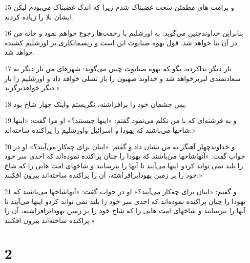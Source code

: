 \par 15 و برامت های مطمئن سخت غضبناک شدم زیرا که اندک غضبناک می‌بودم لیکن ایشان بلا را زیاده کردند.
\par 16 بنابراین خداوندچنین می‌گوید: به اورشلیم با رحمت‌ها رجوع خواهم نمود و خانه من در آن بنا خواهد شد. قول یهوه صبایوت این است و ریسمانکاری بر اورشلیم کشیده خواهد شد.
\par 17 بار دیگر نداکرده، بگو که یهوه صبایوت چنین می‌گوید: شهرهای من بار دیگر به سعادتمندی لبریزخواهد شد و خداوند صهیون را باز تسلی خواهد داد و اورشلیم را بار دیگر خواهدبرگزید.»
\par 18 پس چشمان خود را برافراشته، نگریستم واینک چهار شاخ بود.
\par 19 و به فرشته‌ای که با من تکلم می‌نمود گفتم: «اینها چیستند؟» او مرا گفت: «اینها شاخها می‌باشند که یهودا و اسرائیل واورشلیم را پراکنده ساخته‌اند.»
\par 20 و خداوندچهار آهنگر به من نشان داد.و گفتم: «اینان برای چه‌کار می‌آیند؟» او در جواب گفت: «آنهاشاخها می‌باشند که یهودا را چنان پراکنده نموده‌اند که احدی سر خود را بلند نمی تواند کردو اینها می‌آیند تا آنها را بترسانند و شاخهای امت هایی را که شاخ خود را بر زمین یهودابرافراشته، آن را پراکنده ساخته‌اند بیرون افکنند.»
\par 21 و گفتم: «اینان برای چه‌کار می‌آیند؟» او در جواب گفت: «آنهاشاخها می‌باشند که یهودا را چنان پراکنده نموده‌اند که احدی سر خود را بلند نمی تواند کردو اینها می‌آیند تا آنها را بترسانند و شاخهای امت هایی را که شاخ خود را بر زمین یهودابرافراشته، آن را پراکنده ساخته‌اند بیرون افکنند.»

\chapter{2}

